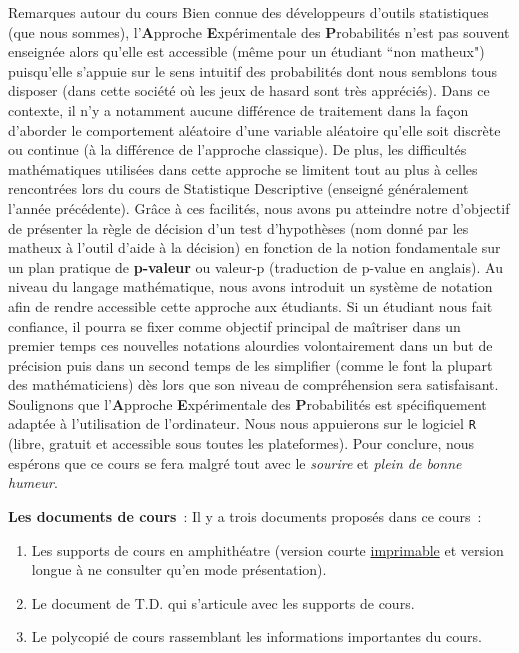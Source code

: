 \documentclass[10pt]{report}
\begin{document}
\begin{IndicList}{Remarques autour du cours}
{Bien connue des développeurs d'outils statistiques (que nous sommes), l'\textbf{A}pproche \textbf{E}xpérimentale des \textbf{P}robabilités n'est pas souvent enseignée alors qu'elle est accessible (même pour un étudiant ``non matheux") puisqu'elle s'appuie sur le sens intuitif des probabilités dont nous semblons tous disposer (dans cette société où les jeux de hasard sont très appréciés).
Dans ce contexte, il n'y a notamment aucune différence de traitement dans la façon d'aborder le comportement aléatoire d'une variable aléatoire qu'elle soit discrète ou continue (à la différence de l'approche classique).  
De plus, les difficultés mathématiques utilisées dans cette approche se limitent tout au plus à celles rencontrées lors du cours de Statistique Descriptive (enseigné généralement l'année précédente). Grâce à ces facilités, nous avons pu atteindre notre d'objectif de présenter la règle de décision d'un test d'hypothèses (nom donné par les matheux à l'outil d'aide à la décision) en fonction de la notion fondamentale sur un plan pratique de \textbf{p-valeur} ou valeur-p (traduction de p-value en anglais). Au niveau du langage mathématique, nous avons introduit un système de notation afin de rendre accessible cette approche aux étudiants. Si un étudiant nous fait confiance, il pourra se fixer comme objectif principal de maîtriser dans un premier temps ces nouvelles notations alourdies volontairement dans un but de précision puis dans un second temps de les simplifier (comme le font la plupart des mathématiciens) dès lors que son niveau de compréhension sera satisfaisant.
Soulignons que l'\textbf{A}pproche \textbf{E}xpérimentale des \textbf{P}robabilités est spécifiquement adaptée à l'utilisation de l'ordinateur. Nous nous appuierons sur le logiciel \texttt{R} (libre, gratuit et accessible sous toutes les plateformes).
Pour conclure, nous espérons que ce cours se fera malgré tout avec le \textit{sourire} et \textit{plein de bonne humeur}.} 
\item {\small \textbf{Les documents de cours}~: Il y a trois documents proposés dans ce cours~:
\begin{enumerate}
\item Les supports de cours en amphithéatre (version courte \underline{imprimable} et version longue à ne consulter qu'en mode présentation).
\item Le document de T.D. qui s'articule avec les supports de cours.
\item Le polycopié de cours rassemblant les informations importantes du cours. 
\end{enumerate}
}
\end{IndicList}
\end{document}
